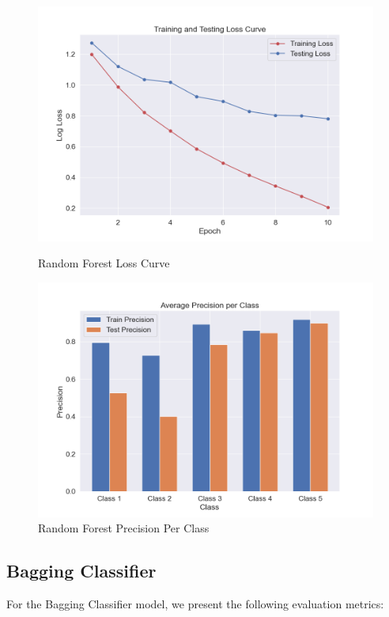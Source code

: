 \begin{figure}[H]
	\begin{minipage}[b]{0.45\textwidth}
		\centering
		\includegraphics[width=\textwidth]{img/paper_1/loss_curve.png}
		\caption{Random Forest Loss Curve}
	\end{minipage}
	\hfill
	\begin{minipage}[b]{0.45\textwidth}
		\centering
		\includegraphics[width=\textwidth]{img/paper_1/precision_per_class.png}
		\caption{Random Forest Precision Per Class}
	\end{minipage}
\end{figure}


\subsection{Bagging Classifier}

For the Bagging Classifier model, we present the following evaluation metrics:

